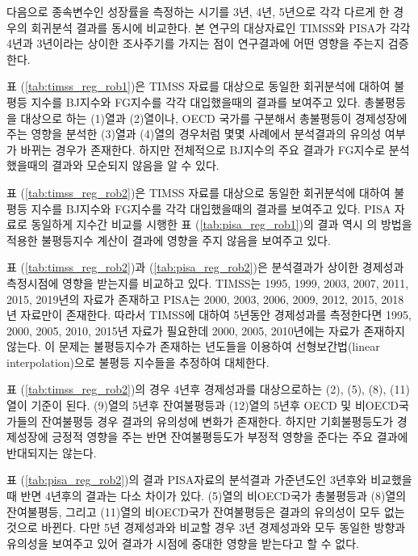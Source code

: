 다음으로 종속변수인 성장률을 측정하는 시기를 3년, 4년, 5년으로 각각 다르게 한 경우의 회귀분석 결과를 동시에 비교한다.
본 연구의 대상자료인 TIMSS와 PISA가 각각 4년과 3년이라는 상이한 조사주기를 가지는 점이 연구결과에 어떤 영향을 주는지 검증한다.

표 (\ref{tab:timss_reg_rob1})은 TIMSS 자료를 대상으로 동일한 회귀분석에 대하여 불평등 지수를 BJ지수와 FG지수를 각각 대입했을때의 결과를 보여주고 있다.
총불평등을 대상으로 하는 (1)열과 (2)열이나, OECD 국가를 구분해서 총불평등이 경제성장에 주는 영향을 분석한 (3)열과 (4)열의 경우처럼 몇몇 사례에서 분석결과의 유의성 여부가 바뀌는 경우가 존재한다.
하지만 전체적으로 BJ지수의 주요 결과가 FG지수로 분석했을때의 결과와 모순되지 않음을 알 수 있다.  



표 (\ref{tab:timss_reg_rob2})은 TIMSS 자료를 대상으로 동일한 회귀분석에 대하여 불평등 지수를 BJ지수와 FG지수를 각각 대입했을때의 결과를 보여주고 있다.
PISA 자료로 동일하게 지수간 비교를 시행한 표 (\ref{tab:pisa_reg_rob1})의 결과 역시 \citet{betl12}의 방법을 적용한 불평등지수 계산이 결과에 영향을 주지 않음을 보여주고 있다.



표 (\ref{tab:timss_reg_rob2})과 (\ref{tab:pisa_reg_rob2})은 분석결과가 상이한 경제성과 측정시점에 영향을 받는지를 비교하고 있다.
TIMSS는 1995, 1999, 2003, 2007, 2011, 2015, 2019년의 자료가 존재하고 PISA는 2000, 2003, 2006, 2009, 2012, 2015, 2018년 자료만이 존재한다.
따라서 TIMSS에 대하여 5년동안 경제성과를 측정한다면 1995, 2000, 2005, 2010, 2015년 자료가 필요한데 2000, 2005, 2010년에는 자료가 존재하지 않는다.
이 문제는 불평등지수가 존재하는 년도들을 이용하여 선형보간법(linear interpolation)으로 불평등 지수들을 추정하여 대체한다.
 
표 (\ref{tab:timss_reg_rob2})의 경우 4년후 경제성과를 대상으로하는 (2), (5), (8), (11)열이 기준이 된다.
(9)열의 5년후 잔여불평등과 (12)열의 5년후 OECD 및 비OECD국가들의 잔여불평등 경우 결과의 유의성에 변화가 존재한다. 하지만 기회불평등도가 경제성장에 긍정적 영향을 주는 반면 잔여불평등도가 부정적 영향을 준다는 주요 결과에 반대되지는 않는다.



표 (\ref{tab:pisa_reg_rob2})의 결과 PISA자료의 분석결과 가준년도인 3년후와 비교했을때 반면 4년후의 결과는 다소 차이가 있다. (5)열의 비OECD국가 총불평등과 (8)열의 잔여불평등, 그리고 (11)열의 비OECD국가 잔여불평등은 결과의 유의성이 모두 없는 것으로 바뀐다. 다만 5년 경제성과와 비교할 경우 3년 경제성과와 모두 동일한 방향과 유의성을 보여주고 있어 결과가 시점에 중대한 영향을 받는다고 할 수 없다.

